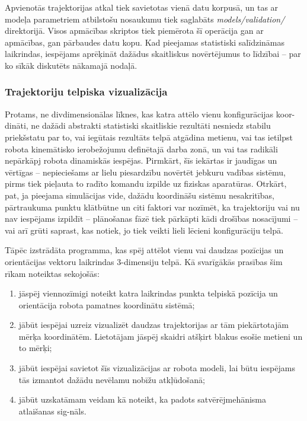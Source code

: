 \documentclass[12pt, a4paper]{article}
\numberwithin{equation}{section} %
\begin{document}
Apvienotās trajektorijas atkal tiek savietotas vienā datu korpusā, un tas ar modeļa parametriem atbilstošu nosaukumu tiek saglabāts \textit{models/validation/} direktorijā. Visos apmācības skriptos tiek piemērota šī operācija gan ar apmācības, gan pārbaudes datu kopu. Kad pieejamas statistiski salīdzināmas laikrindas, iespējams aprēķināt dažādus skaitliskus novērtējumus to līdzībai -- par ko sīkāk diskutēts nākamajā nodaļā.

\subsubsection{Trajektoriju telpiska vizualizācija}

Protams, ne divdimensionālas līknes, kas katra attēlo vienu konfigurācijas koor-dināti, ne dažādi abstrakti statistiski skaitliskie rezultāti nesniedz stabilu priekšstatu par to, vai iegūtais rezultāts telpā atgādina metienu, vai tas ietilpst robota kinemātisko ierobežojumu definētajā darba zonā, un vai tas radikāli nepārkāpj robota dinamiskās iespējas. Pirmkārt, šīs iekārtas ir jaudīgas un vērtīgas -- nepieciešams ar lielu piesardzību novērtēt jebkuru vadības sistēmu, pirms tiek pieļauta to radīto komandu izpilde uz fiziskas aparatūras. Otrkārt, pat, ja pieejama simulācijas vide, dažādu koordināšu sistēmu nesakritības, pārtraukuma punktu klātbūtne un citi faktori var nozīmēt, ka trajektoriju vai nu nav iespējams izpildīt -- plānošanas fāzē tiek pārkāpti kādi drošības nosacījumi -- vai arī grūti saprast, kas notiek, jo tiek veikti lieli lēcieni konfigurāciju telpā.

Tāpēc izstrādāta programma, kas spēj attēlot vienu vai daudzas pozīcijas un orientācijas vektoru laikrindas 3-dimensiju telpā. Kā svarīgākās prasības šim rīkam noteiktas sekojošās:

\begin{enumerate}
    \item jāspēj viennozīmigi noteikt katra laikrindas punkta telpiskā pozīcija un orientācija robota pamatnes koordinātu sistēmā;
    \item jābūt iespējai uzreiz vizualizēt daudzas trajektorijas ar tām piekārtotajām mērķa koordinātēm. Lietotājam jāspēj skaidri atšķirt blakus esošie metieni un to mērķi;
    \item jābūt iespējai savietot šīs vizualizācijas ar robota modeli, lai būtu iespējams tās izmantot dažādu nevēlamu nobīžu atkļūdošanā;
    \item jābūt uzskatāmam veidam kā noteikt, ka padots satvērējmehānisma atlaišanas sig-nāls.
\end{enumerate}
\end{document}
